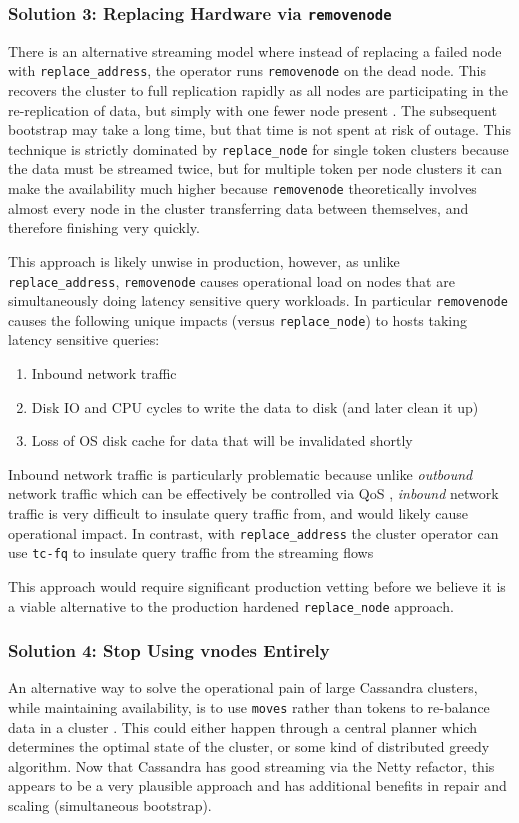 \documentclass{article}
\begin{document}
\subsubsection{Solution 3: Replacing Hardware via \texttt{removenode}}
\label{sec:replacing}
There is an alternative streaming model where instead of replacing a
failed node with \texttt{replace\_address}, the operator runs
\texttt{removenode} on the dead node. This recovers the cluster to
full replication rapidly as all nodes are participating in the
re-replication of data, but simply with one fewer node present
\cite{removenode}. The subsequent bootstrap may take a long time,
but that time is not spent at risk of outage. This technique is strictly
dominated by \texttt{replace\_node} for single token clusters because
the data must be streamed twice, but for multiple token per node clusters
it can make the availability much higher because \texttt{removenode}
theoretically involves almost every node in the cluster transferring
data between themselves, and therefore finishing very quickly.

This approach is likely unwise in production, however, as unlike
\texttt{replace\_address}, \texttt{removenode} causes operational load
on nodes that are simultaneously doing latency sensitive query workloads.
In particular \texttt{removenode} causes the following unique impacts
(versus \texttt{replace\_node}) to hosts taking latency sensitive queries:
\begin{enumerate}
\item{Inbound network traffic}
\item{Disk IO and CPU cycles to write the data to disk (and later clean
it up)}
\item{Loss of OS disk cache for data that will be invalidated shortly}
\end{enumerate}

Inbound network traffic is particularly problematic because unlike
\textit{outbound} network traffic which can be effectively be controlled
via QoS \cite{qos}, \textit{inbound} network traffic is very difficult
to insulate query traffic from, and would likely cause operational impact.
In contrast, with \texttt{replace\_address} the cluster operator can use
\texttt{tc-fq} to insulate query traffic from the streaming flows
\cite{tc-fq}

This approach would require significant production vetting before we
believe it is a viable alternative to the production hardened
\texttt{replace\_node} approach.

\subsubsection{Solution 4: Stop Using vnodes Entirely}
An alternative way to solve the operational pain of large Cassandra clusters,
while maintaining availability, is to use \texttt{moves} rather than
tokens to re-balance data in a cluster \cite{moves}. This could either happen
through a central planner which determines the optimal state of the cluster,
or some kind of distributed greedy algorithm. Now that Cassandra
has good streaming via the Netty refactor, this appears to be a very
plausible approach and has additional benefits in repair
and scaling (simultaneous bootstrap).
\end{document}
